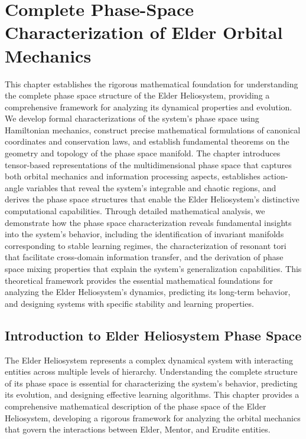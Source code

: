\chapter{Complete Phase-Space Characterization of Elder Orbital Mechanics}

\begin{tcolorbox}[colback=DarkSkyBlue!5!white,colframe=DarkSkyBlue!75!black,title=Chapter Summary]
This chapter establishes the rigorous mathematical foundation for understanding the complete phase space structure of the Elder Heliosystem, providing a comprehensive framework for analyzing its dynamical properties and evolution. We develop formal characterizations of the system's phase space using Hamiltonian mechanics, construct precise mathematical formulations of canonical coordinates and conservation laws, and establish fundamental theorems on the geometry and topology of the phase space manifold. The chapter introduces tensor-based representations of the multidimensional phase space that captures both orbital mechanics and information processing aspects, establishes action-angle variables that reveal the system's integrable and chaotic regions, and derives the phase space structures that enable the Elder Heliosystem's distinctive computational capabilities. Through detailed mathematical analysis, we demonstrate how the phase space characterization reveals fundamental insights into the system's behavior, including the identification of invariant manifolds corresponding to stable learning regimes, the characterization of resonant tori that facilitate cross-domain information transfer, and the derivation of phase space mixing properties that explain the system's generalization capabilities. This theoretical framework provides the essential mathematical foundations for analyzing the Elder Heliosystem's dynamics, predicting its long-term behavior, and designing systems with specific stability and learning properties.
\end{tcolorbox}

\section{Introduction to Elder Heliosystem Phase Space}

The Elder Heliosystem represents a complex dynamical system with interacting entities across multiple levels of hierarchy. Understanding the complete structure of its phase space is essential for characterizing the system's behavior, predicting its evolution, and designing effective learning algorithms. This chapter provides a comprehensive mathematical description of the phase space of the Elder Heliosystem, developing a rigorous framework for analyzing the orbital mechanics that govern the interactions between Elder, Mentor, and Erudite entities.

